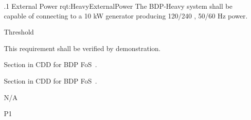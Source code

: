 

\ONERQMTVKSA
{\RqtNumberBase.1}
{External Power}
{rqt:HeavyExternalPower}
{The BDP-Heavy system shall be capable of connecting to a 10 kW generator producing 120/240 \VAC, 50/60 Hz power.}
{
	\item [Phase 1] Threshold
}
{This requirement shall be verified by demonstration.}
{
\item [5.5.9] Section in CDD for BDP FoS~\cite{ref__BDP_FOS_CDD}.
\item [5.5.10.1] Section in CDD for BDP FoS~\cite{ref__BDP_FOS_CDD}.
}
{
	\item N/A
}
{P1}
